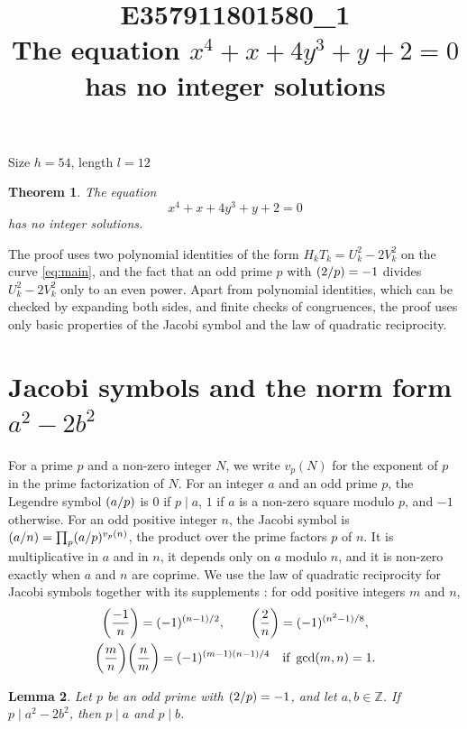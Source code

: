 \documentclass[11pt]{article}
\title{\textbf{E357911801580\_1}\\[4pt] {\Large The equation $x^{4}+x+4y^{3}+y+2=0$ has no integer solutions}}
\author{}
\date{}
\newtheorem{theorem}{Theorem}
\newtheorem{lemma}[theorem]{Lemma}
\newcommand{\Z}{\mathbb{Z}}
\newcommand{\leg}[2]{\mathchoice{\biggl(\dfrac{#1}{#2}\biggr)}{(#1/#2)}{(#1/#2)}{(#1/#2)}}
\begin{document}
\maketitle
\vspace{-8ex}
\begin{center}
Size $h=54$, length $l=12$
\end{center}

\begin{theorem}\label{thm:main}
The equation
\begin{equation}\label{eq:main}
x^{4}+x+4y^{3}+y+2=0
\end{equation}
has no integer solutions.
\end{theorem}

The proof uses two polynomial identities of the form $H_kT_k=U_k^2-2V_k^2$ on the curve \eqref{eq:main}, and the fact that an odd prime $p$ with $\leg{2}{p}=-1$ divides $U_k^2-2V_k^2$ only to an even power. Apart from polynomial identities, which can be checked by expanding both sides, and finite checks of congruences, the proof uses only basic properties of the Jacobi symbol and the law of quadratic reciprocity.

\section{\texorpdfstring{Jacobi symbols and the norm form $a^2-2b^2$}{Jacobi symbols and the norm form}}

For a prime $p$ and a non-zero integer $N$, we write $v_p(N)$ for the exponent of $p$ in the prime factorization of $N$. For an integer $a$ and an odd prime $p$, the Legendre symbol $\leg{a}{p}$ is $0$ if $p\mid a$, $1$ if $a$ is a non-zero square modulo $p$, and $-1$ otherwise. For an odd positive integer $n$, the Jacobi symbol is $\leg{a}{n}=\prod_p\leg{a}{p}^{v_p(n)}$, the product over the prime factors $p$ of $n$. It is multiplicative in $a$ and in $n$, it depends only on $a$ modulo $n$, and it is non-zero exactly when $a$ and $n$ are coprime. We use the law of quadratic reciprocity for Jacobi symbols together with its supplements \cite[Chapter~5, \S2]{IR}: for odd positive integers $m$ and $n$,
\begin{gather*}
\leg{-1}{n}=(-1)^{(n-1)/2},\qquad\leg{2}{n}=(-1)^{(n^2-1)/8},\\
\leg{m}{n}\leg{n}{m}=(-1)^{(m-1)(n-1)/4}\quad\text{if }\gcd(m,n)=1.
\end{gather*}

\begin{lemma}\label{lem:divides}
Let $p$ be an odd prime with $\leg{2}{p}=-1$, and let $a,b\in\Z$. If $p\mid a^2-2b^2$, then $p\mid a$ and $p\mid b$.
\end{lemma}
\end{document}
